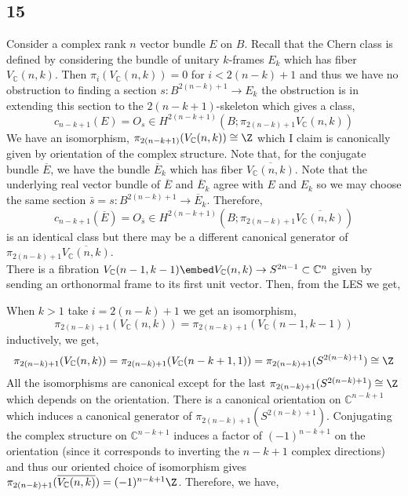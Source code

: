 \documentclass[12pt]{extarticle}
\newcommand{\C}{\mathbb{C}}
\begin{document}
\subsection{15}

Consider a complex rank $n$ vector bundle $E$ on $B$. Recall that the Chern class is defined by considering the bundle of unitary $k$-frames $E_k$ which has fiber $V_\C(n, k)$. Then $\pi_i(V_\C(n, k)) = 0$ for $i < 2(n - k) + 1$ and thus we have no obstruction to finding a section $s : B^{2(n - k) + 1} \to E_k$ the obstruction is in extending this section to the $2(n - k + 1)$-skeleton which gives a class,
\[ c_{n-k+1}(E) = O_{s} \in H^{2(n - k + 1)}(B; \pi_{2(n - k) + 1} V_\C(n, k)) \]
We have an isomorphism, $\pi_{2 (n - k + 1)} (V_\C(n, k)) \cong \Z$ which I claim is canonically given by orientation of the complex structure. Note that, for the conjugate bundle $\overline{E}$, we have the bundle $\overline{E}_k$ which has fiber $\overline{V_\C(n, k)}$. Note that the underlying real vector bundle of $\overline{E}$ and $\overline{E}_k$ agree with $E$ and $E_k$ so we may choose the same section $\bar{s} = s : B^{2(n - k) + 1} \to \overline{E}_k$. Therefore,
\[ c_{n-k+1}(\overline{E}) = O_{\bar{s}} \in H^{2(n - k + 1)}(B; \pi_{2(n - k) + 1} \overline{V_\C(n, k)}) \]
is an identical class but there may be a different canonical generator of $\pi_{2(n - k) + 1} \overline{V_\C(n, k)}$.
\bigskip\\
There is a fibration $V_\C(n-1, k-1) \embed V_\C(n, k) \to S^{2n - 1} \subset \C^{n}$ given by sending an orthonormal frame to its first unit vector. Then, from the LES we get,
\begin{center}
\end{center}
When $k > 1$ take $i = 2(n - k) + 1$ we get an isomorphism,
\[ \pi_{2(n-k)+1}(V_\C(n, k)) = \pi_{2(n - k) + 1}(V_\C(n-1, k-1)) \]
inductively, we get, 
\[ \pi_{2(n-k)+1}(V_\C(n,k)) = \pi_{2(n-k)+1}(V_\C(n-k+1,1)) = \pi_{2(n-k)+1}(S^{2(n-k) + 1}) \cong \Z \]
All the isomorphisms are canonical except for the last $\pi_{2(n-k)+1}(S^{2(n-k)+1}) \cong \Z$ which depends on the orientation. There is a canonical orientation on $\C^{n-k+1}$ which induces a canonical generator of $\pi_{2(n-k) + 1}(S^{2(n-k) + 1})$. Conjugating the complex structure on $\C^{n-k+1}$ induces a factor of $(-1)^{n-k+1}$ on the orientation (since it corresponds to inverting the $n-k+1$ complex directions) and thus our oriented choice of isomorphism gives $\pi_{2(n-k) + 1}(\overline{V_\C(n, k)}) = (-1)^{n-k+1} \Z$. Therefore, we have,
\end{document}
